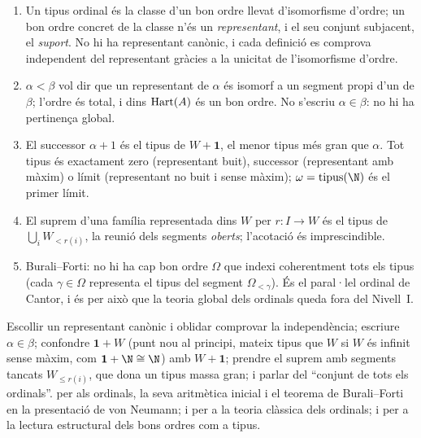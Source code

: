 \begin{resumcap}
\begin{enumerate}
  \item Un tipus ordinal és la classe d'un bon ordre llevat d'isomorfisme d'ordre; un bon ordre concret de la classe n'és un \emph{representant}, i el seu conjunt subjacent, el \emph{suport}. No hi ha representant canònic, i cada definició es comprova independent del representant gràcies a la unicitat de l'isomorfisme d'ordre.
  \item \(\alpha<\beta\) vol dir que un representant de \(\alpha\) és isomorf a un segment propi d'un de \(\beta\); l'ordre és total, i dins \(\operatorname{Hart}(A)\) és un bon ordre. No s'escriu \(\alpha\in\beta\): no hi ha pertinença global.
  \item El successor \(\alpha+1\) és el tipus de \(W+\mathbf1\), el menor tipus més gran que \(\alpha\). Tot tipus és exactament zero (representant buit), successor (representant amb màxim) o límit (representant no buit i sense màxim); \(\omega=\operatorname{tipus}(\N)\) és el primer límit.
  \item El suprem d'una família representada dins \(W\) per \(r\colon I\to W\) és el tipus de \(\bigcup_iW_{<r(i)}\), la reunió dels segments \emph{oberts}; l'acotació és imprescindible.
  \item Burali--Forti: no hi ha cap bon ordre \(\Omega\) que indexi coherentment tots els tipus (cada \(\gamma\in\Omega\) representa el tipus del segment \(\Omega_{<\gamma}\)). És el paral·lel ordinal de Cantor, i és per això que la teoria global dels ordinals queda fora del Nivell~I.
\end{enumerate}
 Escollir un representant canònic i oblidar comprovar la independència; escriure \(\alpha\in\beta\); confondre \(\mathbf1+W\) (punt nou al principi, mateix tipus que \(W\) si \(W\) és infinit sense màxim, com \(\mathbf1+\N\cong\N\)) amb \(W+\mathbf1\); prendre el suprem amb segments tancats \(W_{\le r(i)}\), que dona un tipus massa gran; i parlar del \enquote{conjunt de tots els ordinals}.
 \cite[§§19--21]{halmos} per als ordinals, la seva aritmètica inicial i el teorema de Burali--Forti en la presentació de von Neumann; \cite[cap.~2]{jech2003} i \cite[cap.~I.7--I.8]{kunen2011} per a la teoria clàssica dels ordinals; i \cite[§§8.4--8.5]{lawvere-rosebrugh} per a la lectura estructural dels bons ordres com a tipus.
\end{resumcap}
